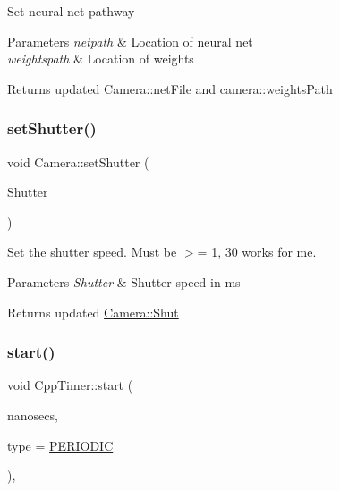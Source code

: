 Set neural net pathway


\begin{DoxyParams}{Parameters}
{\em netpath} & Location of neural net\\
\hline
{\em weightspath} & Location of weights\\
\hline
\end{DoxyParams}
\begin{DoxyReturn}{Returns}
updated Camera\+::net\+File and camera\+::weights\+Path 
\end{DoxyReturn}
\mbox{\label{classCamera_a9409482c4422823f73d45b3d5e29304b}} 
\subsubsection{\texorpdfstring{set\+Shutter()}{setShutter()}}
{\footnotesize\ttfamily void Camera\+::set\+Shutter (\begin{DoxyParamCaption}\item[{int}]{Shutter }\end{DoxyParamCaption})}

Set the shutter speed. Must be $>$= 1, 30 works for me.


\begin{DoxyParams}{Parameters}
{\em Shutter} & Shutter speed in ms\\
\hline
\end{DoxyParams}
\begin{DoxyReturn}{Returns}
updated \hyperlink{classCamera_ad3d6176cdcccecd116f2e7867b642ad1}{Camera\+::\+Shut} 
\end{DoxyReturn}
\mbox{\label{classCppTimer_a64989025caa3c030c6c397ca76a2d20b}} 
\subsubsection{\texorpdfstring{start()}{start()}}
{\footnotesize\ttfamily void Cpp\+Timer\+::start (\begin{DoxyParamCaption}\item[{long}]{nanosecs,  }\item[{\hyperlink{CppTimer_8h_a110d07ab6a96d7815149d3d95435790a}{cpp\+Timer\+Type\+\_\+t}}]{type = {\ttfamily \hyperlink{CppTimer_8h_a110d07ab6a96d7815149d3d95435790aae4379d044711537d9ce3b3b58c575c58}{P\+E\+R\+I\+O\+D\+IC}} }\end{DoxyParamCaption})\hspace{0.3cm}{\ttfamily [virtual]}, {\ttfamily [inherited]}}


